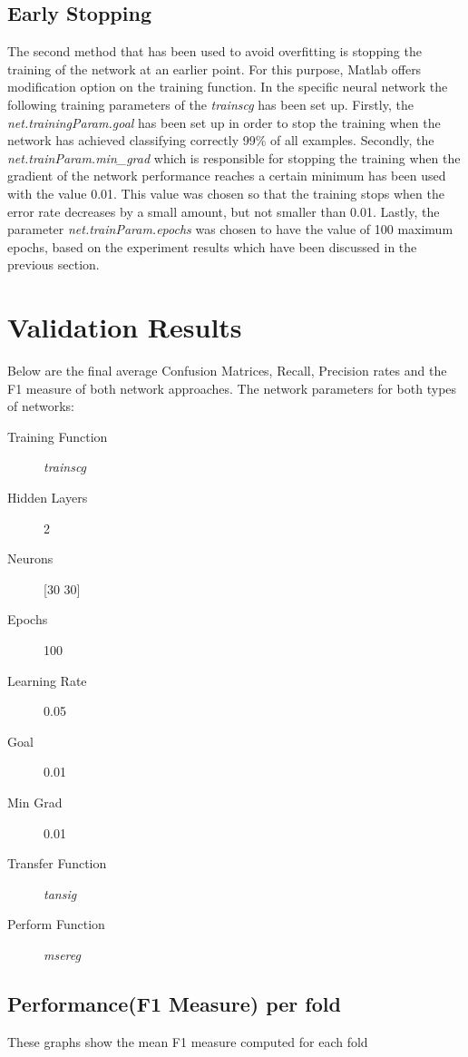 \documentclass[a4paper,11pt]{article}
\begin{document}
\subsection{Early Stopping}
The second method that has been used to avoid overfitting is stopping the training of the network at an earlier point. For this purpose, Matlab offers modification option on the training function. In the specific neural network the following training parameters of the \emph{trainscg} has been set up. Firstly, the \emph{net.trainingParam.goal} has been set up in order to stop the training when the network has achieved classifying correctly 99\% of all examples. Secondly, the \emph{net.trainParam.min\_grad} which is responsible for stopping the training when the gradient of the network performance reaches a certain minimum has been used with the value 0.01. This value was chosen so that the training stops when the error rate decreases by a small amount, but not smaller than 0.01.  Lastly, the parameter \emph{net.trainParam.epochs} was chosen to have the value of 100 maximum epochs, based on the experiment results which have been discussed in the previous section.

\section{Validation Results}
Below are the final average Confusion Matrices, Recall, Precision rates and the F1 measure of both network approaches. The network parameters for both types of networks:

\begin{description}
  \item[Training Function] \emph{trainscg}
  \item[Hidden Layers] 2
  \item[Neurons] [30 30]
  \item[Epochs] 100
  \item[Learning Rate] 0.05
  \item[Goal] 0.01
  \item[Min Grad] 0.01
  \item[Transfer Function] \emph{tansig}
  \item[Perform Function] \emph{msereg}
\end{description}

\pagebreak
\subsection{Performance(F1 Measure) per fold}
These graphs show the mean F1 measure computed for each fold
\end{document}
